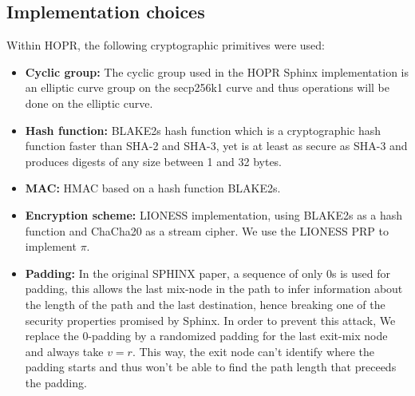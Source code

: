 \subsection{Implementation choices}
Within HOPR, the following cryptographic primitives were used:
\begin{itemize}
    \item \textbf{Cyclic group:} The cyclic group used in the HOPR Sphinx implementation is an elliptic curve group on the secp256k1 curve and thus operations will be done on the elliptic curve.
    \item \textbf{Hash function:} BLAKE2s hash function which is a cryptographic hash function faster than SHA-2 and SHA-3, yet is at least as secure as SHA-3 and produces digests of any size between 1 and 32 bytes.
    \item \textbf{MAC:} HMAC based on a hash function BLAKE2s.
    \item \textbf{Encryption scheme:} LIONESS \cite{lionesspaper} implementation, using BLAKE2s as a hash function and ChaCha20 as a stream cipher. We use the LIONESS PRP to implement $\pi$.
    \item \textbf{Padding:} In the original SPHINX paper, a sequence of only 0s is used for padding, this allows the last mix-node in the path to infer information about the length of the path and the last destination, hence breaking one of the security properties promised by Sphinx. In order to prevent this attack, We replace the 0-padding by a randomized padding for the last exit-mix node and always take $v=r$. This way, the exit node can't identify where the padding starts and thus won't be able to find the path length that preceeds the padding.
\end{itemize}






